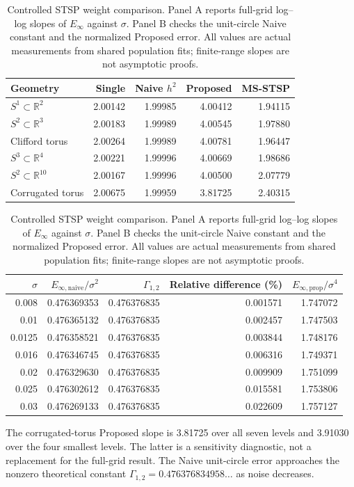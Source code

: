 \begin{table}[t]
\centering\small
\caption{Controlled STSP weight comparison. Panel A reports full-grid log--log slopes of $E_\infty$ against $\sigma$. Panel B checks the unit-circle Naive constant and the normalized Proposed error. All values are actual measurements from shared population fits; finite-range slopes are not asymptotic proofs.}
\label{tab:e1-weight-control}
\begin{tabular}{lrrrr}
\toprule
Geometry & Single & Naive $h^2$ & Proposed & MS-STSP\\
\midrule
$S^1\subset\mathbb{R}^2$ & 2.00142 & 1.99985 & 4.00412 & 1.94115\\
$S^2\subset\mathbb{R}^3$ & 2.00183 & 1.99989 & 4.00545 & 1.97880\\
Clifford torus & 2.00264 & 1.99989 & 4.00781 & 1.96447\\
$S^3\subset\mathbb{R}^4$ & 2.00221 & 1.99996 & 4.00669 & 1.98686\\
$S^2\subset\mathbb{R}^{10}$ & 2.00167 & 1.99996 & 4.00500 & 2.07779\\
Corrugated torus & 2.00675 & 1.99959 & 3.81725 & 2.40315\\
\bottomrule
\end{tabular}
\par\medskip
\begin{tabular}{rrrrr}
\toprule
$\sigma$ & $E_{\infty,\mathrm{naive}}/\sigma^2$ & $\Gamma_{1,2}$ & Relative difference (\%) & $E_{\infty,\mathrm{prop}}/\sigma^4$\\
\midrule
0.008 & 0.476369353 & 0.476376835 & 0.001571 & 1.747072\\
0.01 & 0.476365132 & 0.476376835 & 0.002457 & 1.747503\\
0.0125 & 0.476358521 & 0.476376835 & 0.003844 & 1.748176\\
0.016 & 0.476346745 & 0.476376835 & 0.006316 & 1.749371\\
0.02 & 0.476329630 & 0.476376835 & 0.009909 & 1.751099\\
0.025 & 0.476302612 & 0.476376835 & 0.015581 & 1.753806\\
0.03 & 0.476269133 & 0.476376835 & 0.022609 & 1.757127\\
\bottomrule
\end{tabular}
\par\smallskip\raggedright\footnotesize
The corrugated-torus Proposed slope is 3.81725 over all seven levels and 3.91030 over the four smallest levels. The latter is a sensitivity diagnostic, not a replacement for the full-grid result. The Naive unit-circle error approaches the nonzero theoretical constant $\Gamma_{1,2}=0.476376834958\ldots$ as noise decreases.
\end{table}
